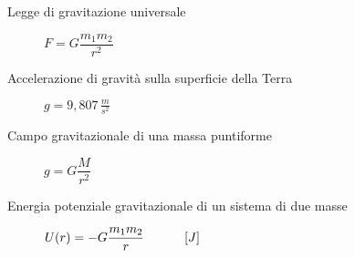 \documentclass[a4paper,11pt,italian]{article}
\begin{document}
\begin{description}
%   
%   
  
  \item[Legge di gravitazione universale] 
  $ F = G \dfrac{m_1 m_2}{r^2} $
  
%   
  \item[Accelerazione di gravità sulla superficie della Terra] 
$ g =  9, 807 \, \frac{m}{s^2} $
  
%   
  \item[Campo gravitazionale di una massa puntiforme] 
  $ g = G \dfrac{M}{r^2} $

%   
%   
  
  \item[Energia potenziale gravitazionale di un sistema di due masse] 
  $ U(r) = - G \dfrac{m_1m_2}{r} \hspace*{3em} \left[ J \right] $
\end{description}
\end{document}
